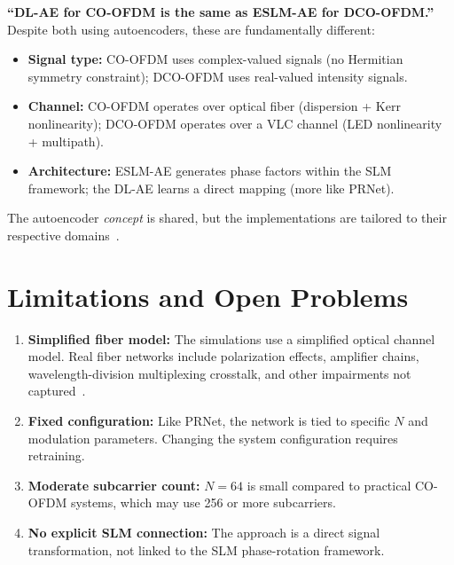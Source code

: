 \begin{misconception}
    \textbf{``DL-AE for CO-OFDM is the same as ESLM-AE for DCO-OFDM.''} \\
    Despite both using autoencoders, these are fundamentally different:
    \begin{itemize}
        \item \textbf{Signal type:} CO-OFDM uses complex-valued signals
              (no Hermitian symmetry constraint); DCO-OFDM uses real-valued
              intensity signals.
        \item \textbf{Channel:} CO-OFDM operates over optical fiber
              (dispersion + Kerr nonlinearity); DCO-OFDM operates over
              a VLC channel (LED nonlinearity + multipath).
        \item \textbf{Architecture:} ESLM-AE generates phase factors within
              the SLM framework; the DL-AE learns a direct mapping
              (more like PRNet).
    \end{itemize}
    The autoencoder \emph{concept} is shared, but the implementations are
    tailored to their respective domains~\cite{alnaseri2025deep,hao2019extended}.
\end{misconception}


\section{Limitations and Open Problems}
\label{sec:dlae_limitations}

\begin{enumerate}
    \item \textbf{Simplified fiber model:}
          The simulations use a simplified optical channel model.
          Real fiber networks include polarization effects, amplifier
          chains, wavelength-division multiplexing crosstalk, and
          other impairments not captured~\cite{alnaseri2025deep}.

    \item \textbf{Fixed configuration:}
          Like PRNet, the network is tied to specific $N$ and modulation
          parameters.  Changing the system configuration requires retraining.

    \item \textbf{Moderate subcarrier count:}
          $N=64$ is small compared to practical CO-OFDM systems,
          which may use 256 or more subcarriers.

    \item \textbf{No explicit SLM connection:}
          The approach is a direct signal transformation, not linked to
          the SLM phase-rotation framework.
\end{enumerate}


